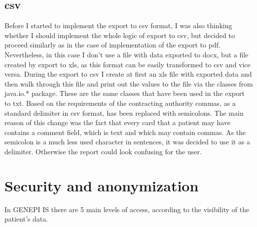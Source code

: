 \documentclass[thesis=B,english]{FITthesis}[2012/10/20]
\begin{document}
\subsection{csv}
Before I started to implement the export to csv format, I was also thinking whether I should implement the whole logic of export to csv, but decided to proceed similarly as in the case of implementation of the export to pdf. Nevertheless, in this case I don't use a file with data exported to docx, but a file created by export to xls, as this format can be easily transformed to csv and vice versa. During the export to csv I create at first an xls file with exported data and then walk through this file and print out the values to the file via the classes from java.io.* package. These are the same classes that have been used in the export to txt. Based on the requirements of the contracting authority commas, as a standard delimiter in csv format, has been replaced with semicolons. The main reason of this change was the fact that every card that a patient may have contains a comment field, which is  text and which may contain commas. As the semicolon is a much less used character in sentences, it was decided to use it as a delimiter. Otherwise the report could look confusing for the user.
\section{Security and anonymization}
In GENEPI IS there are 5 main levels of access, according to the visibility of the patient's data.
\end{document}

